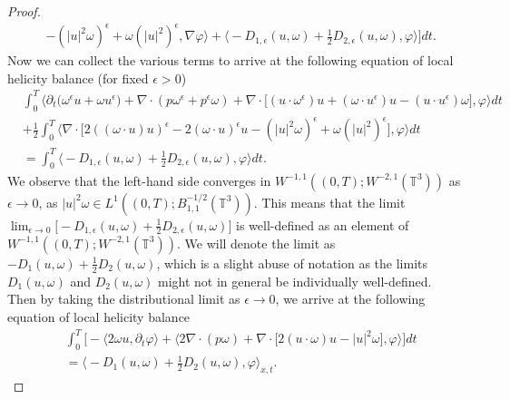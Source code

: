 \documentclass[12pt,a4paper]{article}
\theoremstyle{definition}
\theoremstyle{remark}
\numberwithin{equation}{section}
\begin{document}
\begin{proof}
\begin{align*}
&- ( \lvert u \rvert^2 \omega)^\epsilon + \omega (\lvert u \rvert^2)^\epsilon, \nabla \varphi \bigg\rangle + \bigg\langle - D_{1,\epsilon} (u,\omega) + \frac{1}{2} D_{2,\epsilon} (u,\omega) ,  \varphi \bigg\rangle \bigg] dt.
\end{align*}
\endgroup
Now we can collect the various terms to arrive at the following equation of local helicity balance (for fixed $\epsilon > 0$)
\begin{align}
&\int_0^T \bigg\langle \partial_t \big( \omega^\epsilon u + \omega u^\epsilon \big) + \nabla \cdot (p \omega^\epsilon + p^\epsilon \omega) + \nabla \cdot \big[ (u \cdot \omega^\epsilon) u + (\omega \cdot u^\epsilon) u - (u \cdot u^\epsilon) \omega \big], \varphi \bigg\rangle dt \nonumber \\
&+ \frac{1}{2} \int_0^T \bigg\langle \nabla \cdot \big[ 2((\omega \cdot u) u)^\epsilon - 2(\omega \cdot u)^\epsilon u - ( \lvert u \rvert^2 \omega)^\epsilon + \omega (\lvert u \rvert^2)^\epsilon \big], \varphi \bigg\rangle dt \nonumber \\
&= \int_0^T \bigg\langle - D_{1,\epsilon} (u, \omega) + \frac{1}{2} D_{2,\epsilon} (u, \omega) ,  \varphi \bigg\rangle dt. \label{mollifiedbalance}
\end{align}
We observe that the left-hand side converges in $W^{-1,1} ((0,T); W^{-2,1} (\mathbb{T}^3))$ as $\epsilon \rightarrow 0$, as $\lvert u \rvert^2 \omega \in L^1 ((0,T); B^{-1/2}_{1,1} (\mathbb{T}^3))$. This means that the limit $\lim_{\epsilon \rightarrow 0} \big[ - D_{1,\epsilon} (u, \omega) + \frac{1}{2} D_{2,\epsilon} (u, \omega) \big]$ is well-defined as an element of $W^{-1,1} ((0,T); W^{-2,1} (\mathbb{T}^3))$. We will denote the limit as $-D_{1} (u, \omega) + \frac{1}{2} D_{2} (u, \omega)$, which is a slight abuse of notation as the limits $D_1 (u,\omega)$ and $D_2 (u,\omega)$ might not in general be individually well-defined. Then by taking the distributional limit as $\epsilon \rightarrow 0$, we arrive at the following equation of local helicity balance
\begin{align}
&\int_0^T \bigg[ - \bigg\langle 2 \omega u, \partial_t \varphi \bigg\rangle + \bigg\langle  2 \nabla \cdot (p \omega) + \nabla \cdot \big[ 2 (u \cdot \omega) u - \lvert u \rvert^2 \omega \big], \varphi \bigg\rangle \bigg] dt \nonumber \\
&= \bigg\langle - D_{1} (u, \omega) + \frac{1}{2} D_{2} (u, \omega) ,  \varphi \bigg\rangle_{x,t}. \label{limithelicitybalance}
\end{align}
\end{proof}
\end{document}
